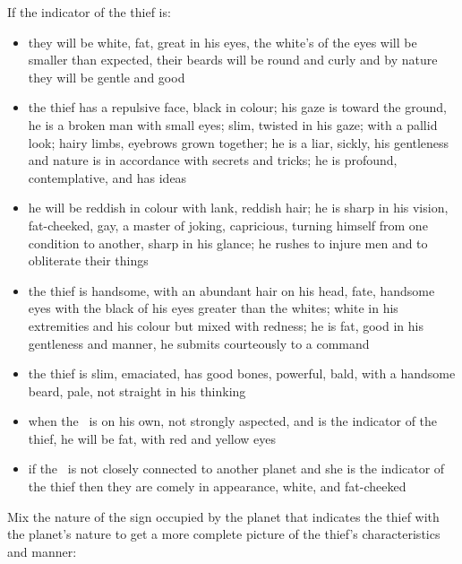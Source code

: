 If the indicator of the thief is:
\begin{itemize}[topsep=0em,itemsep=0em]
\item[\Jupiter] they will be white, fat, great in his eyes, the white's of the eyes will be smaller than expected, their beards will be round and curly and by nature they will be gentle and good
\item[\Saturn] the thief has a  repulsive face, black in colour; his gaze is toward the ground, he is a broken man with small eyes; slim, twisted in his gaze; with a pallid look; hairy limbs, eyebrows grown together; he is a liar, sickly, his gentleness and nature is in accordance with secrets and tricks; he is profound, contemplative, and has ideas
\item[\Mars] he will be reddish in colour with lank, reddish hair; he is sharp in his vision, fat-cheeked, gay, a master of joking, capricious, turning himself from one condition to another, sharp in his glance; he rushes to injure men and to obliterate their things
\item[\Venus]  the thief is handsome, with an abundant hair on his head, fate, handsome eyes with the black of his eyes greater than the whites; white in his extremities and his colour but mixed with redness; he is fat, good in his gentleness and manner, he submits courteously to a command
\item[\Mercury] the thief is slim, emaciated, has good bones, powerful, bald, with a handsome beard, pale, not straight in his thinking
\item[\Sun] when the \Sun\, is on his own, not strongly aspected, and is the indicator of the thief, he will be fat, with red and yellow eyes
\item[\Moon] if the \Moon\, is not closely connected to another planet and she is the indicator of the thief then they are comely in appearance, white, and fat-cheeked
\end{itemize}

Mix the nature of the sign occupied by the planet that indicates the thief with the planet's nature to get a more complete picture of the thief's characteristics and manner:

